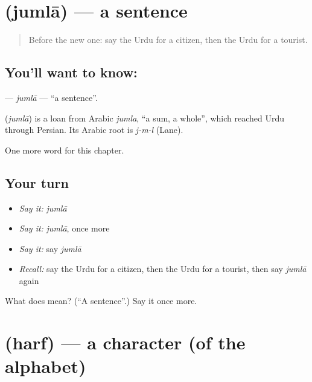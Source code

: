 \section[\texorpdfstring{\ur{جملہ} (jumlā)}{جملہ (jumlā)}]{ (jumlā) — a sentence}

\label{lesson:UR-C171-jumla}



\begin{quote}
Before the new one: say the Urdu for a citizen, then the Urdu for a tourist.
\end{quote}

\subsection*{You'll want to know: }
\textbf{} — \emph{jumlā} — \textquotedblleft{}a sentence\textquotedblright{}.

\begin{cousinweb}
\textbf{} (\emph{jumlā}) is a loan from Arabic \emph{jumla}, \textquotedblleft{}a sum, a whole\textquotedblright{}, which reached Urdu through Persian. Its Arabic root is \emph{j-m-l} (Lane).
\end{cousinweb}

\begin{grammarlens}[title={What you've built}]
One more word for this chapter.
\end{grammarlens}

\subsection*{Your turn}
\begin{itemize}
\raggedright
  \item \emph{Say it:} \emph{jumlā}
  \item \emph{Say it:} \emph{jumlā}, once more
  \item \emph{Say it:} say \emph{jumlā}
  \item \emph{Recall:} say the Urdu for a citizen, then the Urdu for a tourist, then say \emph{jumlā} again
\end{itemize}

\begin{tcolorbox}[breakable,colback=teal!4,colframe=teal!35!black,title={Before you move on}]
What does  mean? (\textquotedblleft{}A sentence\textquotedblright{}.) Say it once more.
\end{tcolorbox}
\section[\texorpdfstring{\ur{حرف} (harf)}{حرف (harf)}]{ (harf) — a character (of the alphabet)}

